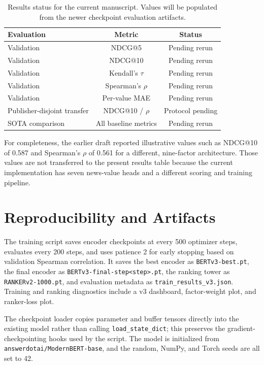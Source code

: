 \documentclass[11pt]{article}
\begin{document}
\begin{table}[t]
\centering
\small
\begin{tabular}{lcc}
\toprule
\textbf{Evaluation} & \textbf{Metric} & \textbf{Status} \\
\midrule
Validation & NDCG@5 & Pending rerun \\
Validation & NDCG@10 & Pending rerun \\
Validation & Kendall's $\tau$ & Pending rerun \\
Validation & Spearman's $\rho$ & Pending rerun \\
Validation & Per-value MAE & Pending rerun \\
Publisher-disjoint transfer & NDCG@10 / $\rho$ & Protocol pending \\
SOTA comparison & All baseline metrics & Pending rerun \\
\bottomrule
\end{tabular}
\caption{Results status for the current manuscript. Values will be populated from the newer checkpoint evaluation artifacts.}
\label{tab:pending}
\end{table}

For completeness, the earlier draft reported illustrative values such as NDCG@10 of 0.587 and Spearman's $\rho$ of 0.561 for a different, nine-factor architecture. Those values are not transferred to the present results table because the current implementation has seven news-value heads and a different scoring and training pipeline.

\section{Reproducibility and Artifacts}

The training script saves encoder checkpoints at every 500 optimizer steps, evaluates every 200 steps, and uses patience 2 for early stopping based on validation Spearman correlation. It saves the best encoder as \texttt{BERTv3-best.pt}, the final encoder as \texttt{BERTv3-final-step<step>.pt}, the ranking tower as \texttt{RANKERv2-1000.pt}, and evaluation metadata as \texttt{train\_results\_v3.json}. Training and ranking diagnostics include a v3 dashboard, factor-weight plot, and ranker-loss plot.

The checkpoint loader copies parameter and buffer tensors directly into the existing model rather than calling \texttt{load\_state\_dict}; this preserves the gradient-checkpointing hooks used by the script. The model is initialized from \texttt{answerdotai/ModernBERT-base}, and the random, NumPy, and Torch seeds are all set to 42.
\end{document}
